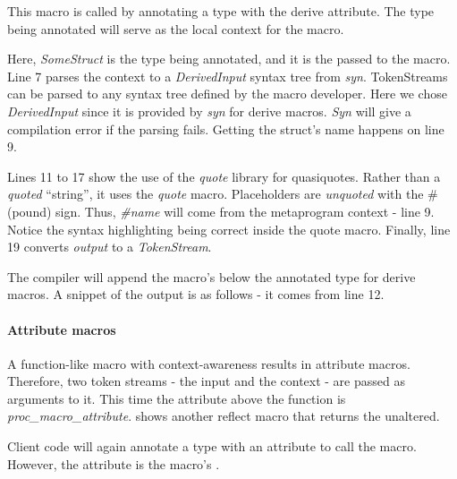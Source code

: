 This macro is called by annotating a type with the derive attribute.
The type being annotated will serve as the local context for the macro.


Here, \textit{SomeStruct} is the type being annotated, and it is the  passed to the macro.
Line 7 parses the context to a \textit{DerivedInput} syntax tree from \textit{syn}.
TokenStreams can be parsed to any syntax tree defined by the macro developer.
Here we chose \textit{DerivedInput} since it is provided by \textit{syn} for derive macros.
\textit{Syn} will give a compilation error if the parsing fails.
Getting the struct's name happens on line 9.

Lines 11 to 17 show the use of the \textit{quote} library for quasiquotes.
Rather than a \textit{quoted} ``string'', it uses the \textit{quote} macro.
Placeholders are \textit{unquoted} with the \# (pound) sign.
Thus, \textit{\#name} will come from the metaprogram context - line 9.
Notice the syntax highlighting being correct inside the quote macro.
Finally, line 19 converts \textit{output} to a \textit{TokenStream}.

The compiler will append the macro's  below the annotated type for derive macros.
A snippet of the output is as follows - it comes from line 12.


\paragraph{Attribute macros}
\label{sec:attribute-macro}
A function-like macro with context-awareness results in attribute macros.
Therefore, two token streams - the input and the context - are passed as arguments to it.
This time the attribute above the function is \textit{proc\_macro\_attribute}.
 shows another reflect macro that returns the  unaltered.


Client code will again annotate a type with an attribute to call the macro.
However, the attribute is the macro's .

